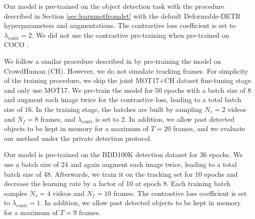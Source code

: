Our model is pre-trained on the object detection task with the procedure described in Section \ref{sec:learnmotfromdet} with the default Deformable-DETR hyperparameters and augmentations. The contrastive loss coefficient is set to $\lambda_{\mathrm{contr}} = 2$. We did not use the contrastive pre-training when pre-trained on COCO \cite{lin2014microsoft}.

 We follow a similar procedure described in \cite{zhou2020tracking} by pre-training the model on CrowdHuman (CH)\cite{shao2018crowdhuman}. However, we do not simulate tracking frames. For simplicity of the training procedure, we skip the joint MOT17+CH dataset fine-tuning stage and only use MOT17. 
We pre-train the model for 50 epochs with a batch size of $8$ and augment each image twice for the contrastive loss, leading to a total batch size of $16$. In the training stage, the batches are built by sampling $N_v=2$ videos and $N_f=8$ frames, and $\lambda_{\mathrm{contr}}$ is set to 2. In addition, we allow past detected objects to be kept in memory for a maximum of $T=20$ frames, and we evaluate our method under the private detection protocol.

 Our model is pre-trained on the BDD100K detection dataset for 36 epochs. We use a batch size of 24 and again augment each image twice, leading to a total batch size of 48. 
Afterwards, we train it on the tracking set for 10 epochs and decrease the learning rate by a factor of 10 at epoch 8. Each training batch samples $N_v=4$ videos and $N_f=10$ frames. The contrastive loss coefficient is set to $\lambda_{\mathrm{contr}} = 1$. In addition, we allow past detected objects to be kept in memory for a maximum of $T=9$ frames.

\vspace{-0.5em}


